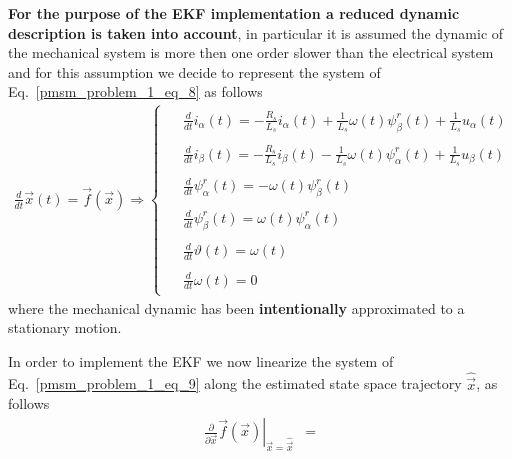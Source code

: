 \documentclass[12pt,a4paper,oneside]{book}
\begin{document}
\begin{onehalfspace}
\vspace{5mm}
\textbf{For the purpose of the EKF implementation a reduced dynamic description is 
	taken into account}, in particular it is assumed the dynamic of the mechanical 
system is more then one order slower than the electrical system and for this 
assumption we decide to represent the system of Eq.~\eqref{pmsm_problem_1_eq_8} as follows
\begin{align}\label{pmsm_problem_1_eq_9}
	\frac{d}{dt}\vec{x}(t)=\vec{f}(\vec{x})\Rightarrow\left\lbrace 
	\begin{aligned}
		\begin{split}
			&\frac{d}{dt}i_\alpha(t) = -\frac{R_s}{L_s}i_\alpha(t) + 	
			\frac{1}{L_s}\omega(t)\psi_\beta^r(t) + \frac{1}{L_s} u_\alpha(t) 
		\end{split}	\\[6pt]
		\begin{split}
			&\frac{d}{dt}i_\beta(t) = -\frac{R_s}{L_s}i_\beta(t) - 	
			\frac{1}{L_s}\omega(t)\psi_\alpha^r(t) + \frac{1}{L_s} u_\beta(t)	
		\end{split}	\\[6pt]
		\begin{split}
			&\frac{d}{dt}\psi_\alpha^r(t) = -\omega(t)\psi_\beta^r(t)
		\end{split}	\\[6pt]
		\begin{split}	
			&\frac{d}{dt}\psi_\beta^r(t) = \omega(t)\psi_\alpha^r(t)	
		\end{split}	\\[6pt]
		\begin{split}
			&\frac{d}{dt}\vartheta(t) = \omega(t)
		\end{split}	\\[6pt]
		\begin{split}
			&\frac{d}{dt}\omega(t) = 0
		\end{split}
	\end{aligned}\right. 
\end{align}
where the mechanical dynamic has been \textbf{intentionally} approximated to a 
stationary motion.
\begin{mybox}
	In order to implement the EKF we now linearize the system of Eq.~\eqref{pmsm_problem_1_eq_9} along the estimated state space trajectory $\hat{\vec{x}}$, as follows
	\begin{equation}\label{pmsm_problem_1_eq_10}
		\begin{aligned}
			\left.\frac{\partial}{\partial 
				\vec{x}}\vec{f}(\vec{x})\right|_{\vec{x}=\hat{\vec{x}}} &= 

\end{aligned}
\end{equation}
\end{mybox}
\end{onehalfspace}
\end{document}
